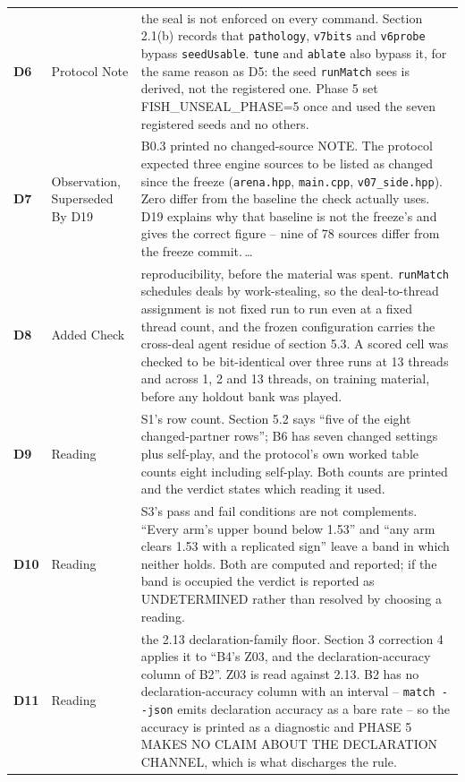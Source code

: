 \begin{xltabular}{\linewidth}{@{}l l L@{}}
\textbf{D6} & Protocol Note & the seal is not enforced on every command. Section 2.1(b) records that \texttt{pathology}, \texttt{v7bits} and \texttt{v6probe} bypass \texttt{seedUsable}. \texttt{tune} and \texttt{ablate} also bypass it, for the same reason as D5: the seed \texttt{runMatch} sees is derived, not the registered one. Phase 5 set FISH\_UNSEAL\_PHASE=5 once and used the seven registered seeds and no others. \\
\textbf{D7} & Observation, Superseded By D19 & B0.3 printed no changed-source NOTE. The protocol expected three engine sources to be listed as changed since the freeze (\texttt{arena.hpp}, \texttt{main.cpp}, \texttt{v07\_side.hpp}). Zero differ from the baseline the check actually uses. D19 explains why that baseline is not the freeze's and gives the correct figure -- nine of 78 sources differ from the freeze commit.\,\ldots \\
\textbf{D8} & Added Check & reproducibility, before the material was spent. \texttt{runMatch} schedules deals by work-stealing, so the deal-to-thread assignment is not fixed run to run even at a fixed thread count, and the frozen configuration carries the cross-deal agent residue of section 5.3. A scored cell was checked to be bit-identical over three runs at 13 threads and across 1, 2 and 13 threads, on training material, before any holdout bank was played. \\
\textbf{D9} & Reading & S1's row count. Section 5.2 says ``five of the eight changed-partner rows''; B6 has seven changed settings plus self-play, and the protocol's own worked table counts eight including self-play. Both counts are printed and the verdict states which reading it used. \\
\textbf{D10} & Reading & S3's pass and fail conditions are not complements. ``Every arm's upper bound below 1.53'' and ``any arm clears 1.53 with a replicated sign'' leave a band in which neither holds. Both are computed and reported; if the band is occupied the verdict is reported as UNDETERMINED rather than resolved by choosing a reading. \\
\textbf{D11} & Reading & the 2.13 declaration-family floor. Section 3 correction 4 applies it to ``B4's Z03, and the declaration-accuracy column of B2''. Z03 is read against 2.13. B2 has no declaration-accuracy column with an interval -- \texttt{match -{}-json} emits declaration accuracy as a bare rate -- so the accuracy is printed as a diagnostic and PHASE 5 MAKES NO CLAIM ABOUT THE DECLARATION CHANNEL, which is what discharges the rule. \\

\end{xltabular}
